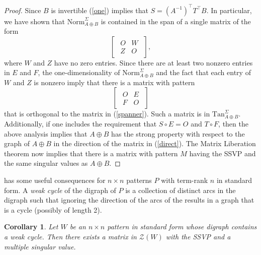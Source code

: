\documentclass[preprint,12pt]{elsarticle}
\newcommand{\trans  }{^\top}
\newtheorem{corollary}[theorem]{Corollary}
\begin{document}
\begin{proof}
Since $B$ 
is invertible (\ref{one}) implies that 
$S=(A^{-1})\trans T\trans B$.  In particular, 
we have shown that $\mbox{Norm}^{\Sigma}_{A \oplus B}$ is contained in the span of a single matrix of the form 
\begin{equation}
\label{spanner}
\begin{bmatrix}
\begin{array}{cc}
O & W
\\
Z& O 
\end{array}
\end{bmatrix},
\end{equation}
where $W$ and $Z$ have no zero entries.
Since there are at least two nonzero entries 
in $E$ and $F$, the one-dimensionality of 
$\mbox{Norm}^{\Sigma}_{A \oplus B}$ and 
the fact that each entry of $W$ and $Z$ is nonzero imply  that there is a matrix with pattern 
\begin{equation}
\label{direct}
\begin{bmatrix}
\begin{array}{cc}
O & E\\
F & O
\end{array}
\end{bmatrix}
\end{equation}
that is orthogonal to the matrix in (\ref{spanner}).  Such a matrix is in
$\mbox{Tan}_{A\oplus B}^{\Sigma}$. 
Additionally, if one includes the requirement 
that 
$S \circ E=O$ and $T \circ F$, then the above analysis 
implies that  $A \oplus B$ has the  strong property with respect to the graph of $A \oplus B$ 
in the direction of the matrix in (\ref{direct}). 
The Matrix Liberation theorem now implies that 
there is a matrix with pattern $M$ having the SSVP and the same singular values as $A \oplus B$.  
\end{proof}

 has some useful consequences 
for $n\times n$ patterns $P$  with term-rank $n$ 
in standard form. A \textit{weak cycle} of the digraph of $P$ is a collection of distinct arcs in the digraph
such that ignoring the direction of the arcs of the results in a graph that is a cycle (possibly of length 2). 


\begin{corollary}
\label{cycleforbid}
Let $W$ be an $n\times n$ pattern in standard
form whose digraph contains a weak cycle. 
Then there exists a matrix in $\mathcal{Z}(W)$
with the SSVP and a multiple singular value.
\end{corollary}
\end{document}
